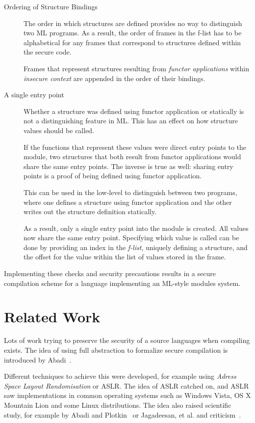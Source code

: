\documentclass[11pt]{article}
\begin{document}
\begin{description}
\item[Ordering of Structure Bindings]
The order in which structures are defined provides no way to distinguish two ML programs.
As a result, the order of frames in the f-list has to be alphabetical for any frames that correspond to structures defined within the secure code.

Frames that represent structures resulting from \emph{functor applications} within \emph{insecure context} are appended in the order of their bindings.

\item[A single entry point]
Whether a structure was defined using functor application or statically is not a distinguishing feature in ML.
This has an effect on how structure values should be called.

If the functions that represent these values were direct entry points to the module, two structures that both result from functor applications would share the same entry points.
The inverse is true as well: sharing entry points is a proof of being defined using functor application.

This can be used in the low-level to distinguish between two programs, where one defines a structure using functor application and the other writes out the structure definition statically.

As a result, only a single entry point into the module is created. 
All values now share the same entry point.
Specifying which value is called can be done by providing an index in the \emph{f-list}, uniquely defining a structure, and the offset for the value within the list of values stored in the frame.
\end{description}

Implementing these checks and security precautions results in a secure compilation scheme for a language implementing an ML-style modules system.

\section{Related Work}
Lots of work trying to preserve the security of a source languages when compiling exists.
The idea of using full abstraction to formalize secure compilation is introduced by Abadi~\cite{Abadi}.

Different techniques to achieve this were developed, for example using \emph{Adress Space Layout Randomisation} or ASLR.%
The idea of ASLR catched on, and ASLR saw implementations in common operating systems such as Windows Vista, OS X Mountain Lion and some Linux distributions. 
The idea also raised scientific study, for example by Abadi and Plotkin~\cite{AbadiASLR} or Jagadeesan, et al.\cite{Jagadeesan} and criticism~\cite{Shacham:2004:EAR:1030083.1030124,Strackx:2009:BMS:1519144.1519145}.
\end{document}
